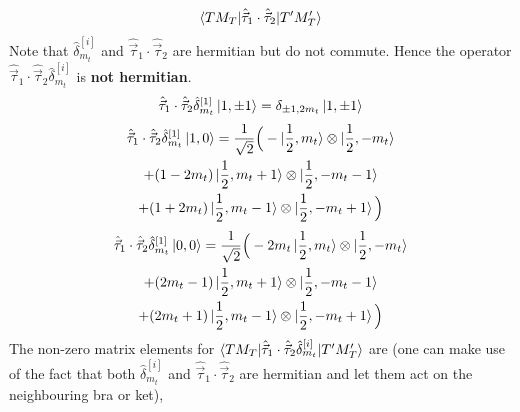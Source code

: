 \documentclass[10pt]{article}
\begin{document}
\begin{align*}
	\braket{ T M_T | \hat{\vec{\tau}}_{1} \cdot \hat{\vec{\tau}}_{2} | T' M_T'}
\end{align*}
Note that $\hat{\delta}_{m_t}^{[i]}$ and $ \hat{\vec{\tau}}_{1} \cdot \hat{\vec{\tau}}_{2}$ are hermitian but do not commute. Hence the operator $\hat{\vec{\tau}}_{1} \cdot \hat{\vec{\tau}}_{2} \hat{\delta}_{m_t}^{[i]}$ is \textbf{not hermitian}.
\begin{align*}
	\hat{\vec{\tau}}_{1} \cdot \hat{\vec{\tau}}_{2} \hat{\delta}_{m_t}^{[1]} \ket { 1, \pm 1 } = \delta_{ \pm 1,2 m_t} \ket{ 1, \pm 1 }
\end{align*}
\begin{multline*}
	\hat{\vec{\tau}}_{1} \cdot \hat{\vec{\tau}}_{2} \hat{\delta}_{m_t}^{[1]} \ket { 1, 0 } = \frac{1}{\sqrt{2}} \Big( - \ket{ \frac{1}{2}, m_t} \otimes \ket{ \frac{1}{2}, -m_t} \\
	 + (1-2m_t) \ket{ \frac{1}{2}, m_t + 1} \otimes \ket{ \frac{1}{2},- m_t - 1} \\
	+  (1+2m_t) \ket{ \frac{1}{2}, m_t -1 } \otimes \ket{ \frac{1}{2}, -m_t + 1} \Big) \\
\end{multline*}
\begin{multline*}
	\hat{\vec{\tau}}_{1} \cdot \hat{\vec{\tau}}_{2} \hat{\delta}_{m_t}^{[1]} \ket { 0, 0 } = \frac{1}{\sqrt{2}} \Big( - 2m_t \ket{ \frac{1}{2}, m_t} \otimes \ket{ \frac{1}{2}, -m_t} \\
	 + (2m_t-1) \ket{ \frac{1}{2}, m_t + 1} \otimes \ket{ \frac{1}{2},- m_t - 1} \\
	+  (2m_t+1) \ket{ \frac{1}{2}, m_t -1 } \otimes \ket{ \frac{1}{2}, -m_t + 1} \Big) \\
\end{multline*}
The non-zero matrix elements for $ \braket{ T M_T | \hat{\vec{\tau}}_{1} \cdot \hat{\vec{\tau}}_{2} \hat{\delta}_{m_t}^{[i]} | T' M_T'}$ are (one can make use of the fact that both $\hat{\delta}_{m_t}^{[i]}$ and $ \hat{\vec{\tau}}_{1} \cdot \hat{\vec{\tau}}_{2}$ are hermitian and let them act on the neighbouring bra or ket),
\end{document}
